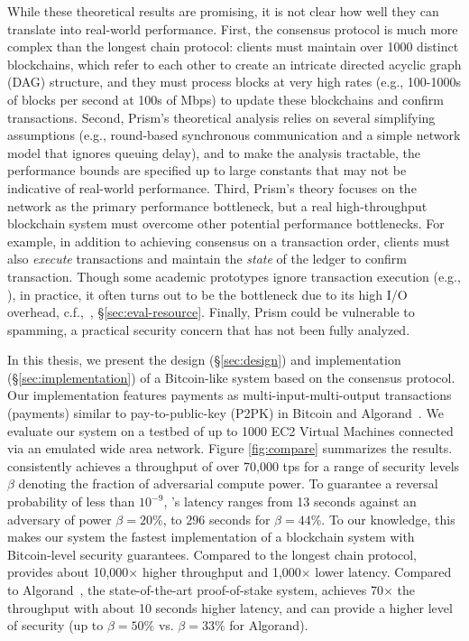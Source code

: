 While these theoretical results are promising, it is not clear how well they can translate into real-world performance. First, the \prism consensus protocol is much more complex than the longest chain protocol: clients must maintain over 1000 distinct blockchains, which refer to each other to create an intricate directed acyclic graph (DAG) structure, and they must process blocks at very high rates (e.g., 100-1000s of blocks per second at 100s of Mbps) to update these blockchains and confirm transactions. Second, Prism's theoretical analysis relies on several simplifying assumptions (e.g., round-based synchronous communication and a simple network model that ignores queuing delay), and to make the analysis tractable, the performance bounds are specified up to large constants that may not be indicative of real-world performance. Third, Prism's theory focuses on the network as the primary performance bottleneck, but a real high-throughput blockchain system must overcome other potential performance bottlenecks. For example, in addition to achieving consensus on a transaction order, clients must also {\em execute} transactions and maintain the {\em state} of the ledger to confirm transaction. Though some academic prototypes ignore transaction execution (e.g., \cite{ohiecode, conflux}),
in practice, it often turns out to be the bottleneck due to its high I/O overhead, c.f.,~\cite{raju2018mlsm},  \S\ref{sec:eval-resource}.
Finally, Prism could be vulnerable to spamming, a practical security concern that has not been fully analyzed. 






In this thesis, we present the design (\S\ref{sec:design}) and  implementation (\S\ref{sec:implementation}) of a Bitcoin-like system based on the \prism consensus protocol. Our implementation features payments as multi-input-multi-output transactions (payments) similar to pay-to-public-key (P2PK) in Bitcoin and Algorand~\cite{algorand, algorandcode}. We evaluate our system on a testbed of up to 1000 EC2 Virtual Machines connected via an emulated wide area network. Figure \ref{fig:compare} summarizes the results. \prism consistently achieves a throughput of over 70,000 tps for a range of security levels $\beta$ denoting the fraction of adversarial compute power.  To guarantee a reversal probability of less than $10^{-9}$, \prism's latency ranges from 13 seconds against an adversary of power $\beta = 20\%$, to $296$ seconds for $\beta = 44\%$. To our knowledge, this makes our system the fastest  implementation of a blockchain system with Bitcoin-level security guarantees. Compared to the longest chain protocol, \prism provides about 10,000$\times$ higher throughput and 1,000$\times$ lower latency. Compared to Algorand~\cite{algorand}, the state-of-the-art proof-of-stake system, \prism achieves 70$\times$ the throughput with about 10 seconds higher latency, and can provide a higher level of security  (up to $\beta = 50\%$ vs. $\beta=33\%$ for Algorand).


